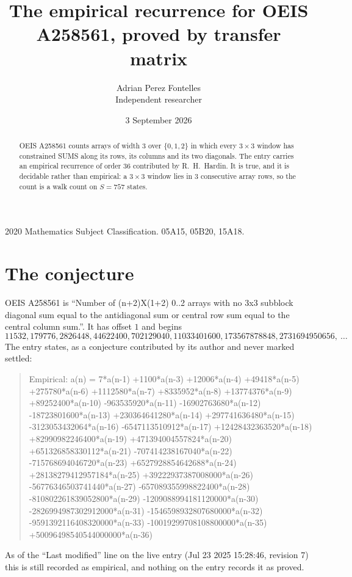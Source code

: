 \documentclass[11pt,a4paper]{article}
\title{The empirical recurrence for OEIS A258561, proved by transfer matrix}
\author{Adrian Perez Fontelles\\ \small Independent researcher}
\date{3 September 2026}
\theoremstyle{plain}
\theoremstyle{definition}
\begin{document}
\maketitle

\begin{abstract}
OEIS A258561 counts arrays of width $3$ over $\{0,1,2\}$ in which every $3\times3$ window has
constrained SUMS along its rows, its columns and its two diagonals. The entry carries an
empirical recurrence of order $36$ contributed by R.~H.~Hardin. It is true, and it is
decidable rather than empirical: a $3\times3$ window lies in $3$ consecutive array rows,
so the count is a walk count on $S=757$ states.
\end{abstract}

\noindent\small 2020 Mathematics Subject Classification. 05A15, 05B20, 15A18.\normalsize

\section{The conjecture}

OEIS A258561 is ``Number of (n+2)X(1+2) 0..2 arrays with no 3x3 subblock diagonal sum equal to the antidiagonal sum or central row sum equal to the central column sum.''. It has offset $1$ and begins
\[
11532, 179776, 2826448, 44622400, 702129040, 11033401600, 173567878848, 2731694950656,\ \dots
\]
The entry states, as a conjecture contributed by its author and never marked settled:
\begin{quote}
Empirical: a(n) = 7*a(n-1) +1100*a(n-3) +12006*a(n-4) +49418*a(n-5) +275780*a(n-6) +1112580*a(n-7) +8335952*a(n-8) +13774376*a(n-9) +89252400*a(n-10) -963535920*a(n-11) -16902763680*a(n-12) -18723801600*a(n-13) +230364641280*a(n-14) +297741636480*a(n-15) -3123053432064*a(n-16) -6547113510912*a(n-17) +12428432363520*a(n-18) +82990982246400*a(n-19) +471394004557824*a(n-20) +651326858330112*a(n-21) -707414238167040*a(n-22) -715768694046720*a(n-23) +6527928854642688*a(n-24) +28138279412957184*a(n-25) +39222937387008000*a(n-26) -56776346503741440*a(n-27) -657089355998822400*a(n-28) -810802261839052800*a(n-29) -1209088994181120000*a(n-30) -2826994987302912000*a(n-31) -1546598932807680000*a(n-32) -9591392116408320000*a(n-33) -10019299708108800000*a(n-35) +50096498540544000000*a(n-36)
\end{quote}
As of the ``Last modified'' line on the live entry (Jul 23 2025 15:28:46, revision 7) this is still
recorded as empirical, and nothing on the entry records it as proved.
\end{document}
